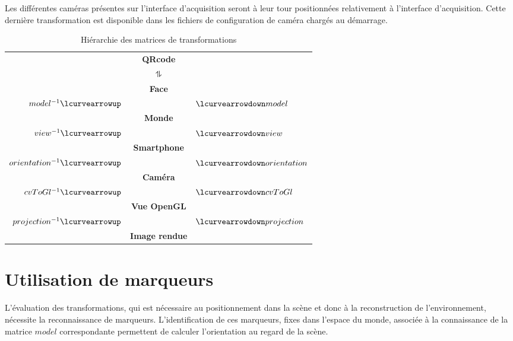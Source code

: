 \documentclass[10pt,a4paper,twoside, twocolumn]{report}
\begin{document}
Les différentes caméras présentes sur l’interface d’acquisition seront à leur tour positionnées relativement à l’interface d’acquisition. Cette dernière transformation est disponible dans les fichiers de configuration de caméra chargés au démarrage.

\begin{table}[!ht]
	\centering
	\begin{tabular}{rcl}
																			& \textbf{QRcode}				&																\\[.2cm]
		$ $																& $\updownharpoons$			& $ $														\\[.2cm]
																			& \textbf{Face}					&																\\[.2cm]
		$model^{-1}				\lcurvearrowup$	&												& $\lcurvearrowdown model$			\\[.2cm]
																			& \textbf{Monde}				&																\\[.2cm]
		$view^{-1}				\lcurvearrowup$	& 											& $\lcurvearrowdown view$				\\[.2cm]
																			& \textbf{Smartphone}		&																\\[.2cm]
		$orientation^{-1}	\lcurvearrowup$	& 											& $\lcurvearrowdown orientation$\\[.2cm]
																			& \textbf{Caméra}				&																\\[.2cm]
		$cvToGl^{-1}			\lcurvearrowup$	& 											& $\lcurvearrowdown cvToGl $		\\[.2cm]
																			& \textbf{Vue OpenGL}		&																\\[.2cm]
		$projection^{-1}	\lcurvearrowup$	&												& $\lcurvearrowdown projection$	\\[.2cm]
																			& \textbf{Image rendue}	&
	\end{tabular}
	\caption{Hiérarchie des matrices de transformations}
	\label{ref:table:hierarchie}
\end{table}



\section{Utilisation de marqueurs}

L’évaluation des transformations, qui est nécessaire au positionnement dans la scène et donc à la reconstruction de l’environnement, nécessite la reconnaissance de marqueurs. L’identification de ces marqueurs, fixes dans l’espace du monde, associée à la connaissance de la matrice $model$ correspondante permettent de calculer l’orientation au regard de la scène.
\end{document}

